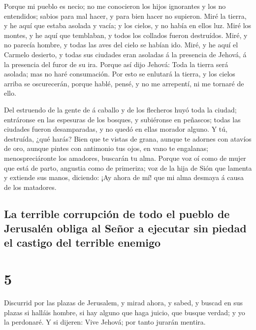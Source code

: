  Porque mi pueblo es necio; no me conocieron los hijos
ignorantes y los no entendidos; sabios para mal hacer, y para bien hacer
no supieron.  Miré la tierra, y he aquí que estaba
asolada y vacía; y los cielos, y no había en ellos luz. 
Miré los montes, y he aquí que temblaban, y todos los collados fueron
destruídos.  Miré, y no parecía hombre, y todas las aves
del cielo se habían ido.  Miré, y he aquí el Carmelo
desierto, y todas sus ciudades eran asoladas á la presencia de Jehová, á
la presencia del furor de su ira.  Porque así dijo
Jehová: Toda la tierra será asolada; mas no haré consumación.
 Por esto se enlutará la tierra, y los cielos arriba se
oscurecerán, porque hablé, pensé, y no me arrepentí, ni me tornaré de
ello.

 Del estruendo de la gente de á caballo y de los
flecheros huyó toda la ciudad; entráronse en las espesuras de los
bosques, y subiéronse en peñascos; todas las ciudades fueron
desamparadas, y no quedó en ellas morador alguno.  Y tú,
destruída, ¿qué harás? Bien que te vistas de grana, aunque te adornes
con atavíos de oro, aunque pintes con antimonio tus ojos, en vano te
engalanas; menospreciáronte los amadores, buscarán tu alma.
 Porque voz oí como de mujer que está de parto, angustia
como de primeriza; voz de la hija de Sión que lamenta y extiende sus
manos, diciendo: ¡Ay ahora de mí! que mi alma desmaya á causa de los
matadores.

\hypertarget{la-terrible-corrupciuxf3n-de-todo-el-pueblo-de-jerusaluxe9n-obliga-al-seuxf1or-a-ejecutar-sin-piedad-el-castigo-del-terrible-enemigo}{%
\subsection{La terrible corrupción de todo el pueblo de Jerusalén obliga
al Señor a ejecutar sin piedad el castigo del terrible
enemigo}\label{la-terrible-corrupciuxf3n-de-todo-el-pueblo-de-jerusaluxe9n-obliga-al-seuxf1or-a-ejecutar-sin-piedad-el-castigo-del-terrible-enemigo}}

\hypertarget{section-24-5}{%
\section{5}\label{section-24-5}}

 Discurrid por las plazas de Jerusalem, y mirad ahora, y
sabed, y buscad en sus plazas si halláis hombre, si hay alguno que haga
juicio, que busque verdad; y yo la perdonaré.  Y si
dijeren: Vive Jehová; por tanto jurarán mentira.


